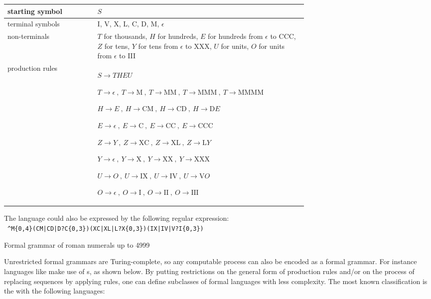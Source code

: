 \begin{example}[h]
\begin{centering}
\begin{tabular}{ |l|p{0.7\linewidth}| }
\hline
starting symbol & $S$ \\
\hline
terminal symbols & I, V, X, L, C, D, M, $\epsilon$ \\
\hline
non-terminals &
$T$ for thousands, 
$H$ for hundreds,
$E$ for hundreds from $\epsilon$ to CCC,
$Z$ for tens,
$Y$ for tens from $\epsilon$ to XXX,
$U$ for units,
$O$ for units from $\epsilon$ to III
\\
\hline
production rules &
$S \rightarrow THEU $

$T \rightarrow \epsilon \ ,\  
 T \rightarrow \textrm{M} \ ,\  
 T \rightarrow \textrm{MM} \ ,\ 
 T \rightarrow \textrm{MMM} \ ,\ 
 T \rightarrow \textrm{MMMM}$

$H \rightarrow E \ ,\ 
 H \rightarrow \textrm{CM} \ ,\ 
 H \rightarrow \textrm{CD} \ ,\ 
 H \rightarrow \textrm{D}E $

$E \rightarrow \epsilon \ ,\ 
 E \rightarrow \textrm{C} \ ,\  
 E \rightarrow \textrm{CC} \ ,\  
 E \rightarrow \textrm{CCC}$

$Z \rightarrow Y \ ,\ 
 Z \rightarrow \textrm{XC} \ ,\
 Z \rightarrow \textrm{XL} \ ,\    
 Z \rightarrow \textrm{L}Y $

$Y \rightarrow \epsilon \ ,\ 
 Y \rightarrow \textrm{X} \ ,\  
 Y \rightarrow \textrm{XX} \ ,\  
 Y \rightarrow \textrm{XXX} $

$U \rightarrow O \ ,\  
 U \rightarrow \textrm{IX} \ ,\  
 U \rightarrow \textrm{IV} \ ,\  
 U \rightarrow \textrm{V}O$

$O \rightarrow \epsilon \ ,\ 
 O \rightarrow \textrm{I} \ ,\  
 O \rightarrow \textrm{II} \ ,\  
 O \rightarrow \textrm{III} $
\\
\hline
\end{tabular}
\end{centering}
The language could also be expressed by the 
following regular expression:\\
~\verb!^M{0,4}(CM|CD|D?C{0,3})(XC|XL|L?X{0,3})(IX|IV|V?I{0,3})!
\caption{Formal grammar of roman numerals up to 4999}
\label{ex:romannum}
\end{example}

Unrestricted formal grammars are Turing-complete, so any computable process can
also be encoded as a formal grammar. For instance  languages like  make use of
\term{rewriting system}s, as shown below. By putting restrictions on the
general form of production rules and/or on the process of replacing sequences
by applying rules, one can define subclasses of formal languages with less
complexity. The most known classification is the  with
the following languages:

